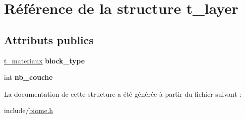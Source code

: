 \hypertarget{structt__layer}{}\section{Référence de la structure t\+\_\+layer}
\label{structt__layer}
\subsection*{Attributs publics}
\begin{DoxyCompactItemize}
\item 
\mbox{\label{structt__layer_a07c0a76a334e2f15025928b382d480ba}} 
\hyperlink{block_8h_a4030ebe0eea609635f372f2e86d4332a}{t\+\_\+materiaux} {\bfseries block\+\_\+type}
\item 
\mbox{\label{structt__layer_a18a0e4a590f56ec4e1e4b2ecd1b45f06}} 
int {\bfseries nb\+\_\+couche}
\end{DoxyCompactItemize}


La documentation de cette structure a été générée à partir du fichier suivant \+:\begin{DoxyCompactItemize}
\item 
include/\hyperlink{biome_8h}{biome.\+h}\end{DoxyCompactItemize}

